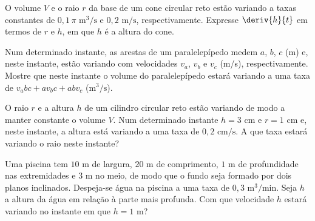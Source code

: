 \begin{exercicio}[11]
\label{ex:7.17.11}
O volume $V$ e o raio $r$ da base de um cone circular reto estão variando a taxas constantes de $0{,}1\,\pi\text{ m}^3\text{/s}$ e $0{,}2\text{ m/s}$, respectivamente. Expresse $\deriv{h}{t}$ em termos de $r$ e $h$, em que $h$ é a altura do cone.
\end{exercicio}

\begin{exercicio}[12]
\label{ex:7.17.12}
Num determinado instante, as arestas de um paralelepípedo medem $a$, $b$, $c$ (m) e, neste instante, estão variando com velocidades $v_a$, $v_b$ e $v_c$ (m/s), respectivamente. Mostre que neste instante o volume do paralelepípedo estará variando a uma taxa de $v_a bc + a v_b c + ab v_c$ ($\text{m}^3\text{/s}$).
\end{exercicio}

\begin{exercicio}[13]
\label{ex:7.17.13}
O raio $r$ e a altura $h$ de um cilindro circular reto estão variando de modo a manter constante o volume $V$. Num determinado instante $h = 3\text{ cm}$ e $r = 1\text{ cm}$ e, neste instante, a altura está variando a uma taxa de $0{,}2\text{ cm/s}$. A que taxa estará variando o raio neste instante?
\end{exercicio}

\begin{exercicio}[14]
\label{ex:7.17.14}
Uma piscina tem $10\text{ m}$ de largura, $20\text{ m}$ de comprimento, $1\text{ m}$ de profundidade nas extremidades e $3\text{ m}$ no meio, de modo que o fundo seja formado por dois planos inclinados. Despeja-se água na piscina a uma taxa de $0{,}3\text{ m}^3\text{/min}$. Seja $h$ a altura da água em relação à parte mais profunda. Com que velocidade $h$ estará variando no instante em que $h = 1\text{ m}$?

\begin{center}
\end{center}
\end{exercicio}

